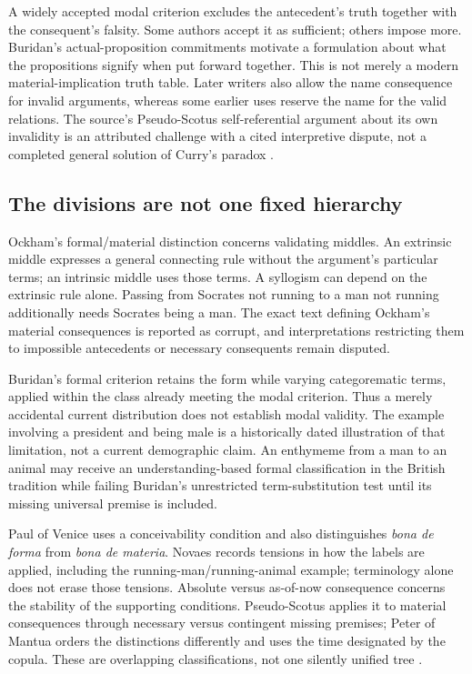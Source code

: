 A widely accepted modal criterion excludes the antecedent's truth together
with the consequent's falsity. Some authors accept it as sufficient;
others impose more. Buridan's actual-proposition commitments motivate a
formulation about what the propositions signify when put forward together.
This is not merely a modern material-implication truth table.
Later writers also allow the name consequence for invalid arguments,
whereas some earlier uses reserve the name for the valid relations.
The source's Pseudo-Scotus self-referential argument about its own invalidity
is an attributed challenge with a cited interpretive dispute, not a
completed general solution of Curry's paradox
\cite[pp.~471--473]{DutilhNovaes2007FordhamChapter8}.

\subsection{The divisions are not one fixed hierarchy}

Ockham's formal/material distinction concerns validating middles.
An extrinsic middle expresses a general connecting rule without the
argument's particular terms; an intrinsic middle uses those terms.
A syllogism can depend on the extrinsic rule alone.
Passing from Socrates not running to a man not running additionally
needs Socrates being a man. The exact text defining Ockham's material
consequences is reported as corrupt, and interpretations restricting
them to impossible antecedents or necessary consequents remain disputed.

Buridan's formal criterion retains the form while varying categorematic
terms, applied within the class already meeting the modal criterion.
Thus a merely accidental current distribution does not establish modal
validity. The example involving a president and being male is a historically
dated illustration of that limitation, not a current demographic claim.
An enthymeme from a man to an animal may receive an understanding-based
formal classification in the British tradition while failing Buridan's
unrestricted term-substitution test until its missing universal premise
is included.

Paul of Venice uses a conceivability condition and also distinguishes
\emph{bona de forma} from \emph{bona de materia}. Novaes records tensions
in how the labels are applied, including the running-man/running-animal
example; terminology alone does not erase those tensions.
Absolute versus as-of-now consequence concerns the stability of the
supporting conditions. Pseudo-Scotus applies it to material consequences
through necessary versus contingent missing premises; Peter of Mantua
orders the distinctions differently and uses the time designated by the
copula. These are overlapping classifications, not one silently unified
tree \cite[pp.~474--478]{DutilhNovaes2007FordhamChapter8}.


